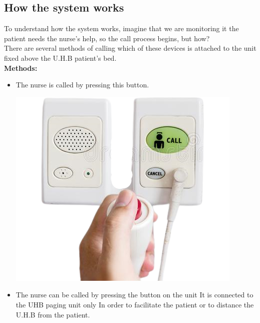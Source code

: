 \documentclass[12pt,fleqn]{book} %
\begin{document}
\subsection{How the system works}
To understand how the system works, imagine that we are monitoring it the patient needs the nurse's help, so the call process begins, but how?
\\ There are several methods of calling which of these devices is attached to the unit fixed above the U.H.B patient's bed.
\\ \textbf{Methods:}
\begin{itemize}
    \item \begin{minipage}{0.6\textwidth}\raggedright
The nurse is called by pressing this button.
\end{minipage}
\begin{minipage}{0.4\textwidth}
\includegraphics[width=\linewidth]{nurse call 1.png}
\end{minipage}
\item \begin{minipage}{0.6\textwidth}\raggedright
The nurse can be called by pressing the button on the unit It is connected to the UHB paging unit only In order to facilitate the patient or to distance the U.H.B from the patient.
\end{minipage}
\begin{minipage}{0.3\textwidth}

\end{minipage}
\end{itemize}
\end{document}
